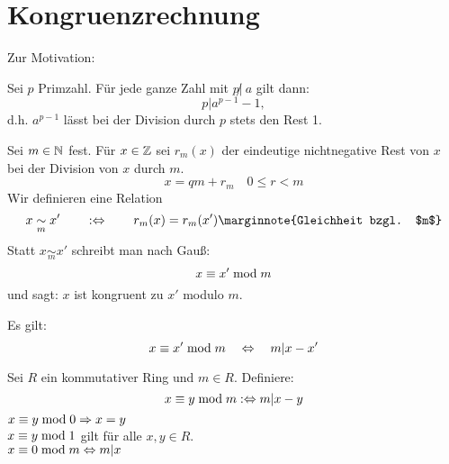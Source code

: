 \section{Kongruenzrechnung}
\label{sec:para3}
	Zur Motivation:
	
\begin{satz} \label{satz_3.1}
	Sei $p$ Primzahl. Für jede ganze Zahl mit $p \not | \ a$ gilt dann:
	\[ p | a^{p-1} - 1, \]
	d.h. $a^{p-1}$ lässt bei der Division durch $p$ stets den Rest 1. 
\end{satz}

\begin{defn}[Kongruenz in $\ZZ$] \label{def_3.1}
	Sei $m \in \mathbb{N}$ fest. Für $x\in \mathbb{Z}$ sei $r_m(x)$ der eindeutige nichtnegative Rest von $x$ bei der Division von $x$ durch $m$. 
	\[ x = qm + r_m \quad 0 \leq r < m \]
	Wir definieren eine Relation
	\[ x \underset{m}{\sim} x' \qquad :\Leftrightarrow \qquad r_m(x) = r_m(x') \marginnote{Gleichheit bzgl. $m$}\]
	Statt $x \underset{m}{\sim} x'$ schreibt man nach Gauß:
	\[ x \equiv x' \bmod m \]
	und sagt: $x$ ist kongruent zu $x'$ modulo $m$. 
\end{defn}

\begin{falko} \label{F3.1}
	Es gilt:
	\[ x \equiv x' \bmod m \quad \Leftrightarrow \quad m | x-x' \]	
\end{falko}

\setcounter{defn}{0}
\begin{defn} \label{def_3.1a}
	Sei $R$ ein kommutativer Ring und $m \in R$. Definiere:
	\[ x \equiv y \bmod m :\Leftrightarrow m | x-y \]
	$x \equiv y \bmod 0 \Rightarrow x=y$ \\
	$x \equiv y \bmod 1$ gilt für alle $x,y \in R$. \\
	$x \equiv 0 \bmod m \Leftrightarrow m | x$
\end{defn}

